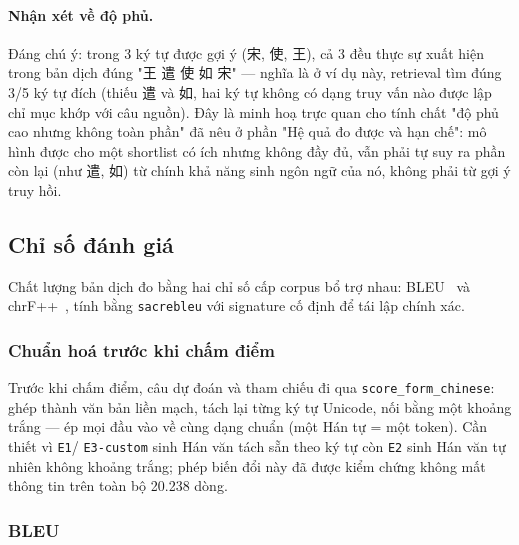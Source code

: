 \paragraph{Nhận xét về độ phủ.} Đáng chú ý: trong 3 ký tự được gợi ý (宋, 使, 王), cả 3
đều thực sự xuất hiện trong bản dịch đúng "王 遣 使 如 宋" — nghĩa là ở ví dụ này, retrieval
tìm đúng 3/5 ký tự đích (thiếu 遣 và 如, hai ký tự không có dạng truy vấn nào được lập chỉ
mục khớp với câu nguồn). Đây là minh hoạ trực quan cho tính chất "độ phủ cao nhưng không
toàn phần" đã nêu ở phần "Hệ quả đo được và hạn chế": mô hình được cho một shortlist có
ích nhưng không đầy đủ, vẫn phải tự suy ra phần còn lại (như 遣, 如) từ chính khả năng
sinh ngôn ngữ của nó, không phải từ gợi ý truy hồi.


\subsection{Chỉ số đánh giá}

Chất lượng bản dịch đo bằng hai chỉ số cấp corpus bổ trợ nhau: BLEU~\cite{papineni2002bleu}
và chrF++~\cite{popovic2015chrf,popovic2017chrfpp}, tính bằng \texttt{sacrebleu} với
signature cố định để tái lập chính xác.

\subsubsection{Chuẩn hoá trước khi chấm điểm}

Trước khi chấm điểm, câu dự đoán và tham chiếu đi qua \texttt{score\_form\_chinese}:
ghép thành văn bản liền mạch, tách lại từng ký tự Unicode, nối bằng một khoảng trắng —
ép mọi đầu vào về cùng dạng chuẩn (một Hán tự = một token). Cần thiết vì \texttt{E1}/
\texttt{E3-custom} sinh Hán văn tách sẵn theo ký tự còn \texttt{E2} sinh Hán văn tự
nhiên không khoảng trắng; phép biến đổi này đã được kiểm chứng không mất thông tin trên
toàn bộ 20.238 dòng.

\subsubsection{BLEU}

